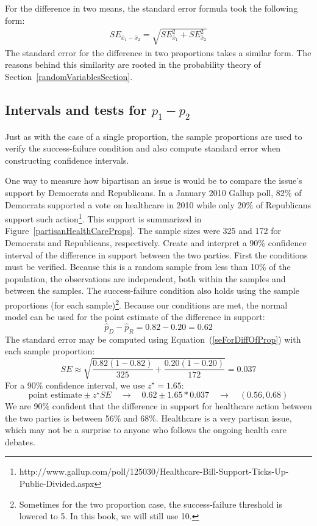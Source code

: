 For the difference in two means, the standard error formula took the following form:
\begin{eqnarray*}
SE_{\bar{x}_{1} - \bar{x}_{2}} = \sqrt{SE_{\bar{x}_1}^2 + SE_{\bar{x}_2}^2}
\end{eqnarray*}
The standard error for the difference in two proportions takes a similar form. The reasons behind this similarity are rooted in the probability theory of Section~\ref{randomVariablesSection}.

\subsection{Intervals and tests for $p_1-p_2$}

Just as with the case of a single proportion, the sample proportions are used to verify the success-failure condition and also compute standard error when constructing confidence intervals.

\begin{example}{One way to measure how bipartisan an issue is would be to compare the issue's support by Democrats and Republicans. In a January 2010 Gallup poll, 82\% of Democrats supported a vote on healthcare in 2010 while only 20\% of Republicans support such action\footnote{\scriptsize http://www.gallup.com/poll/125030/Healthcare-Bill-Support-Ticks-Up-Public-Divided.aspx}. This support is summarized in Figure~\ref{partisanHealthCareProps}. The sample sizes were 325 and 172 for Democrats and Republicans, respectively. Create and interpret a 90\% confidence interval of the difference in support between the two parties.}
First the conditions must be verified. Because this is a random sample from less than 10\% of the population, the observations are independent, both within the samples and between the samples. The success-failure condition also holds using the sample proportions (for each sample)\footnote{Sometimes for the two proportion case, the success-failure threshold is lowered to 5. In this book, we will still use 10.}. Because our conditions are met, the normal model can be used for the point estimate of the difference in support:
$$\hat{p}_D - \hat{p}_R = 0.82 - 0.20 = 0.62$$
The standard error may be computed using Equation~(\ref{seForDiffOfProp}) with each sample proportion:
$$SE \approx \sqrt{\frac{0.82(1-0.82)}{325} + \frac{0.20(1-0.20)}{172}} = 0.037$$
For a 90\% confidence interval, we use $z^{\star} = 1.65$:
$$\text{point estimate} \pm z^{\star}SE \quad \to \quad 0.62 \pm 1.65 * 0.037 \quad \to \quad (0.56, 0.68)$$
We are 90\% confident that the difference in support for healthcare action between the two parties is between 56\% and 68\%. Healthcare is a very partisan issue, which may not be a surprise to anyone who follows the ongoing health care debates.
\end{example}

